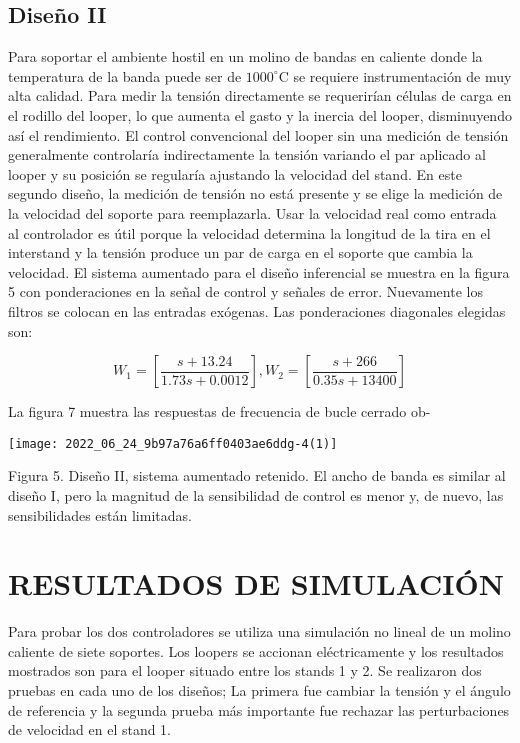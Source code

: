 \subsection{Diseño II}
Para soportar el ambiente hostil en un molino de bandas en caliente donde la temperatura de la banda puede ser de $ 1000^{\circ} \mathrm{C}$ se requiere instrumentación de muy alta calidad. Para medir la tensión directamente se requerirían células de carga en el rodillo del looper, lo que aumenta el gasto y la inercia del looper, disminuyendo así el rendimiento. El control convencional del looper sin una medición de tensión generalmente controlaría indirectamente la tensión variando el par aplicado al looper y su posición se regularía ajustando la velocidad del stand. En este segundo diseño, la medición de tensión no está presente y se elige la medición de la velocidad del soporte para reemplazarla. Usar la velocidad real como entrada al controlador es útil porque la velocidad determina la longitud de la tira en el interstand y la tensión produce un par de carga en el soporte que cambia la velocidad. El sistema aumentado para el diseño inferencial se muestra en la figura 5 con ponderaciones en la señal de control y señales de error. Nuevamente los filtros se colocan en las entradas exógenas. Las ponderaciones diagonales elegidas son:

$$
W_{1}=\left[\frac{s+13.24}{1.73 s+0.0012}\right], W_{2}=\left[\frac{s+266}{0.35 s+13400}\right]
$$

La figura 7 muestra las respuestas de frecuencia de bucle cerrado ob-

\begin{center}
\texttt{[image: 2022\_06\_24\_9b97a76a6ff0403ae6ddg-4(1)]}
\end{center}

Figura 5. Diseño II, sistema aumentado retenido. El ancho de banda es similar al diseño I, pero la magnitud de la sensibilidad de control es menor y, de nuevo, las sensibilidades están limitadas.

\section{RESULTADOS DE SIMULACIÓN}
Para probar los dos controladores se utiliza una simulación no lineal de un molino caliente de siete soportes. Los loopers se accionan eléctricamente y los resultados mostrados son para el looper situado entre los stands 1 y 2. Se realizaron dos pruebas en cada uno de los diseños; La primera fue cambiar la tensión y el ángulo de referencia y la segunda prueba más importante fue rechazar las perturbaciones de velocidad en el stand 1.


